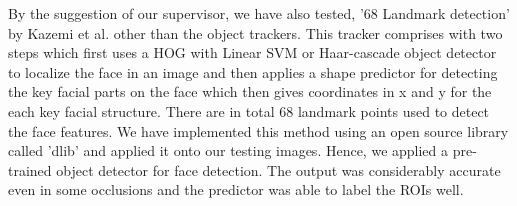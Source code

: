 \documentclass[conference]{IEEEtran}
\begin{document}
By the suggestion of our supervisor, we have also tested, ’68 Landmark detection’ by Kazemi et al. \cite{b21} other than the object trackers. This tracker comprises with two steps which first uses a HOG with Linear SVM or Haar-cascade object detector to localize the face in an image and then applies a shape predictor for detecting the key facial parts on the face which then gives coordinates in x and y for the each key facial structure. There are in total 68 landmark points used to detect the face features. We have implemented this method using an open source library called ’dlib’ and applied it onto our testing images. Hence, we applied a pre-trained object detector for face detection. The output was considerably accurate even in some occlusions and the predictor was able to label the ROIs well.\\
\end{document}

